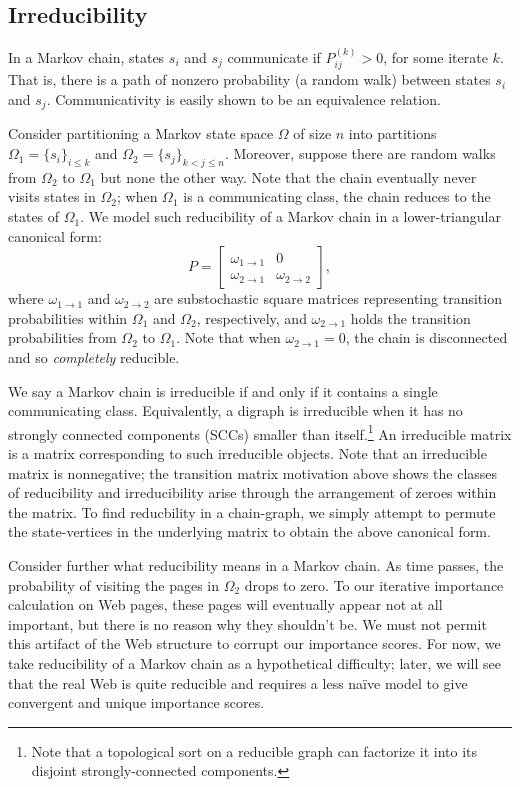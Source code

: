\documentclass[12pt]{article}
\newcommand{\iterate}[2]{#1^{(#2)}}
\begin{document}
\subsection{Irreducibility}
In a Markov chain, states $s_i$ and $s_j$ communicate if
$\iterate{P}{k}_{ij} > 0$, for some iterate $k$. That is, there is a path of
nonzero probability (a random walk) between states $s_i$ and $s_j$.
Communicativity is easily shown to be an equivalence relation.

Consider partitioning a Markov state space $\Omega$ of size $n$ into partitions
$\Omega_1 = \{ s_i \}_{i\leq k}$ and $\Omega_2 = \{ s_j \}_{k < j \leq n}$.
Moreover, suppose there are random walks from $\Omega_2$ to $\Omega_1$ but none
the other way. Note that the chain eventually never visits states in $\Omega_2$;
when $\Omega_1$ is a communicating class, the chain reduces to the states of
$\Omega_1$. We model such reducibility of a Markov chain in a lower-triangular
canonical form:
\begin{equation*}
  \label{eqn:reducible}
  P =
  \begin{bmatrix}
    \omega_{1\to 1} & 0 \\
    \omega_{2 \to 1} & \omega_{2 \to 2}
  \end{bmatrix},
\end{equation*}
where $\omega_{1\to 1}$ and $\omega_{2\to 2}$ are substochastic square matrices
representing transition probabilities within $\Omega_1$ and $\Omega_2$,
respectively, and $\omega_{2 \to 1}$ holds the transition probabilities from
$\Omega_2$ to $\Omega_1$. Note that when $\omega_{2\to 1} = 0$, the chain is
disconnected and so \textit{completely} reducible.

We say a Markov chain is irreducible if and only if it contains a single
communicating class. Equivalently, a digraph is irreducible when it has no
strongly connected components (SCCs) smaller than itself.\footnote{Note that a
  topological sort on a reducible graph can factorize it into its disjoint
  strongly-connected components.} An irreducible matrix is a matrix
corresponding to such irreducible objects. Note that an irreducible matrix is
nonnegative; the transition matrix motivation above shows the classes of
reducibility and irreducibility arise through the arrangement of zeroes within
the matrix. To find reducbility in a chain-graph, we simply attempt to permute
the state-vertices in the underlying matrix to obtain the above canonical form.

Consider further what reducibility means in a Markov chain. As time passes, the
probability of visiting the pages in $\Omega_2$ drops to zero. To our iterative
importance calculation on Web pages, these pages will eventually appear not at
all important, but there is no reason why they shouldn't be. We must not permit
this artifact of the Web structure to corrupt our importance scores. For now, we
take reducibility of a Markov chain as a hypothetical difficulty; later, we will
see that the real Web is quite reducible and requires a less naïve model to give
convergent and unique importance scores.
\end{document}
